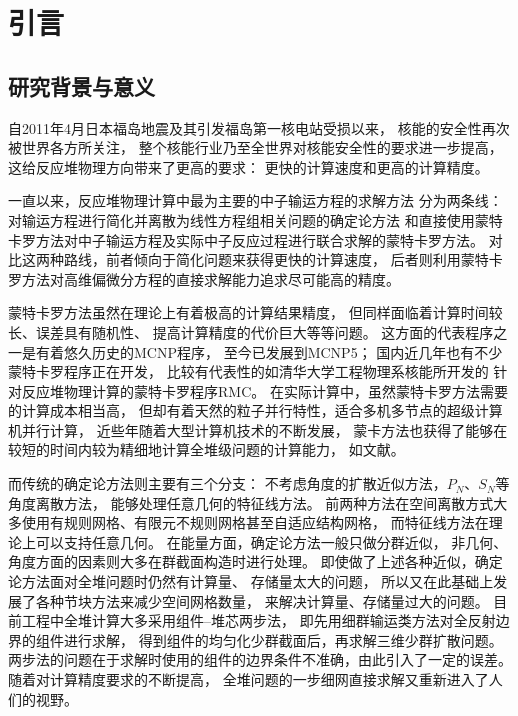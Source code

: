 
\chapter{引言}
\section{研究背景与意义}

自2011年4月日本福岛地震及其引发福岛第一核电站受损以来，
核能的安全性再次被世界各方所关注，
整个核能行业乃至全世界对核能安全性的要求进一步提高，
这给反应堆物理方向带来了更高的要求：
更快的计算速度和更高的计算精度。

一直以来，反应堆物理计算中最为主要的中子输运方程的求解方法
分为两条线：对输运方程进行简化并离散为线性方程组相关问题的确定论方法
和直接使用蒙特卡罗方法对中子输运方程及实际中子反应过程进行联合求解的蒙特卡罗方法。
对比这两种路线，前者倾向于简化问题来获得更快的计算速度，
后者则利用蒙特卡罗方法对高维偏微分方程的直接求解能力追求尽可能高的精度。

蒙特卡罗方法虽然在理论上有着极高的计算结果精度，
但同样面临着计算时间较长、误差具有随机性、
提高计算精度的代价巨大等等问题。
这方面的代表程序之一是有着悠久历史的MCNP程序\cite{forster2004mcnp}，
至今已发展到MCNP5；
国内近几年也有不少蒙特卡罗程序正在开发，
比较有代表性的如清华大学工程物理系核能所开发的
针对反应堆物理计算的蒙特卡罗程序RMC\cite{li2010development}。
在实际计算中，虽然蒙特卡罗方法需要的计算成本相当高，
但却有着天然的粒子并行特性，适合多机多节点的超级计算机并行计算，
近些年随着大型计算机技术的不断发展，
蒙卡方法也获得了能够在较短的时间内较为精细地计算全堆级问题的计算能力，
如文献。

而传统的确定论方法则主要有三个分支：
不考虑角度的扩散近似方法，$P_N$、$S_N$等角度离散方法，
能够处理任意几何的特征线方法。
前两种方法在空间离散方式大多使用有规则网格、有限元不规则网格甚至自适应结构网格\cite{wang2009three}，
而特征线方法在理论上可以支持任意几何。
在能量方面，确定论方法一般只做分群近似，
非几何、角度方面的因素则大多在群截面构造时进行处理。
即使做了上述各种近似，确定论方法面对全堆问题时仍然有计算量、
存储量太大的问题\cite{azmy1997multiprocessing}，
所以又在此基础上发展了各种节块方法来减少空间网格数量，
来解决计算量、存储量过大的问题。
目前工程中全堆计算大多采用组件--堆芯两步法，
即先用细群输运类方法对全反射边界的组件进行求解，
得到组件的均匀化少群截面后，再求解三维少群扩散问题。
两步法的问题在于求解时使用的组件的边界条件不准确，由此引入了一定的误差。
随着对计算精度要求的不断提高，
全堆问题的一步细网直接求解又重新进入了人们的视野。

